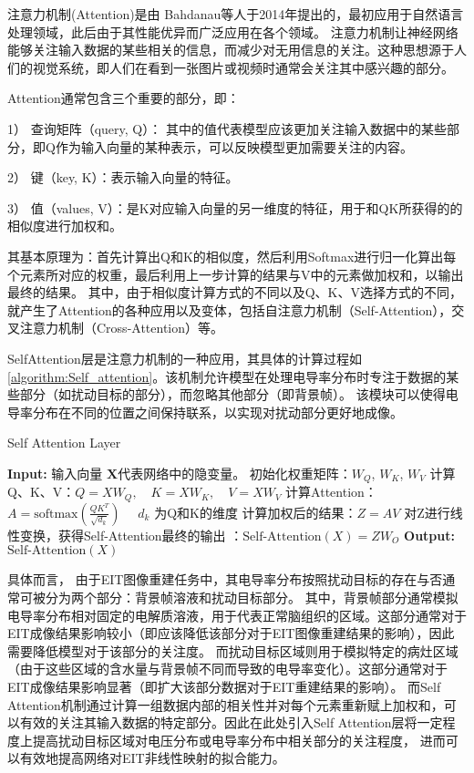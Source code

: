 注意力机制(Attention)是由 Bahdanau等人于2014年提出的\cite{2014Neural}，最初应用于自然语言处理领域，此后由于其性能优异而广泛应用在各个领域。
注意力机制让神经网络能够关注输入数据的某些相关的信息，而减少对无用信息的关注。这种思想源于人们的视觉系统，即人们在看到一张图片或视频时通常会关注其中感兴趣的部分。

Attention通常包含三个重要的部分，即：

  1） 查询矩阵（query, Q）： 其中的值代表模型应该更加关注输入数据中的某些部分，即Q作为输入向量的某种表示，可以反映模型更加需要关注的内容。
  
  2） 键（key, K）：表示输入向量的特征。

  3） 值（values, V）：是K对应输入向量的另一维度的特征，用于和QK所获得的的相似度进行加权和。


其基本原理为：首先计算出Q和K的相似度，然后利用Softmax进行归一化算出每个元素所对应的权重，最后利用上一步计算的结果与V中的元素做加权和，以输出最终的结果。
其中，由于相似度计算方式的不同以及Q、K、V选择方式的不同，就产生了Attention的各种应用以及变体，包括自注意力机制（Self-Attention），交叉注意力机制（Cross-Attention）等。

SelfAttention层是注意力机制的一种应用，其具体的计算过程如\cref{algorithm:Self_attention}。该机制允许模型在处理电导率分布时专注于数据的某些部分（如扰动目标的部分），而忽略其他部分（即背景帧）。
该模块可以使得电导率分布在不同的位置之间保持联系，以实现对扰动部分更好地成像。

\begin{algorithm}

\caption{Self Attention Layer}
\begin{algorithmic}[1]
    \State \textbf{Input:} 输入向量 $\boldsymbol{X}$代表网络中的隐变量。
    \State 初始化权重矩阵：$W_Q$, $W_K$, $W_V$
    \State 计算Q、K、V：$Q = XW_Q, \quad K = XW_K, \quad V = XW_V$
    \State 计算Attention：$A = \text{softmax}\left(\frac{QK^T}{\sqrt{d_k}}\right) \quad $ $d_k$ 为Q和K的维度 
    \State 计算加权后的结果：$Z = AV$
    \State 对Z进行线性变换，获得Self-Attention最终的输出 ：$\text{Self-Attention}(X) = ZW_O$
    \State \textbf{Output:} $\text{Self-Attention}(X)$
\end{algorithmic}
\label{algorithm:Self_attention}
\end{algorithm}

具体而言， 由于EIT图像重建任务中，其电导率分布按照扰动目标的存在与否通常可被分为两个部分：背景帧溶液和扰动目标部分。
其中，背景帧部分通常模拟电导率分布相对固定的电解质溶液，用于代表正常脑组织的区域。这部分通常对于EIT成像结果影响较小（即应该降低该部分对于EIT图像重建结果的影响），因此需要降低模型对于该部分的关注度。
而扰动目标区域则用于模拟特定的病灶区域（由于这些区域的含水量与背景帧不同而导致的电导率变化）。这部分通常对于EIT成像结果影响显著（即扩大该部分数据对于EIT重建结果的影响）。
而Self Attention机制通过计算一组数据内部的相关性并对每个元素重新赋上加权和，可以有效的关注其输入数据的特定部分。因此在此处引入Self Attention层将一定程度上提高扰动目标区域对电压分布或电导率分布中相关部分的关注程度，
进而可以有效地提高网络对EIT非线性映射的拟合能力。

